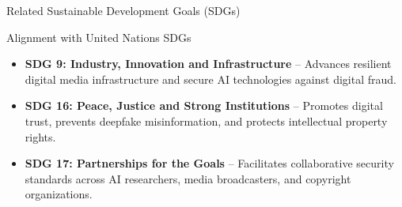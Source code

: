 \documentclass[10pt, aspectratio=169]{beamer}
\begin{document}
\begin{frame}{Related Sustainable Development Goals (SDGs)}
  \begin{block}{Alignment with United Nations SDGs}
    \begin{itemize}
      \item \textbf{SDG 9: Industry, Innovation and Infrastructure} -- Advances resilient digital media infrastructure and secure AI technologies against digital fraud.
      \item \textbf{SDG 16: Peace, Justice and Strong Institutions} -- Promotes digital trust, prevents deepfake misinformation, and protects intellectual property rights.
      \item \textbf{SDG 17: Partnerships for the Goals} -- Facilitates collaborative security standards across AI researchers, media broadcasters, and copyright organizations.
    \end{itemize}
  \end{block}
\end{frame}

\end{document}
